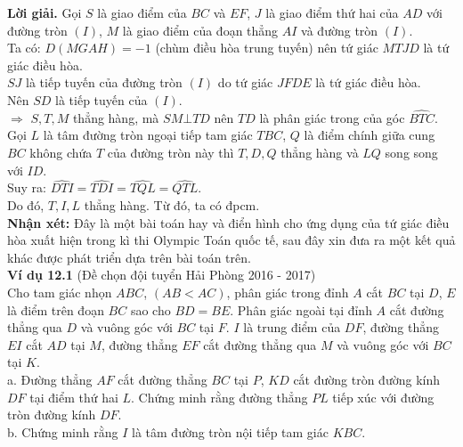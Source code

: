 \documentclass[12pt,a4paper]{article}
\begin{document}
\textbf{Lời giải.} Gọi \(S\) là giao điểm của \(BC\) và \(EF\), \(J\) là giao điểm thứ hai của \(AD\) với đường tròn \(\left( I \right)\), \(M\) là giao điểm của đoạn thẳng \(AI\) và đường tròn \(\left( I \right)\). \\
Ta có: \(D\left( {MGAH} \right) =  - 1\) (chùm điều hòa trung tuyến) nên tứ giác \(MTJD\) là tứ giác điều hòa.\\
\(SJ\) là tiếp tuyến của đường tròn \(\left( I \right)\) do tứ giác \(JFDE\) là tứ giác điều hòa.\\
Nên \(SD\) là tiếp tuyến của \(\left( I \right)\).\\
\( \Rightarrow \) \(S, T, M\) thẳng hàng, mà \(SM \bot TD\) nên \(TD\) là phân giác trong của góc \(\widehat {BTC}.\)\\
Gọi \(L\) là tâm đường tròn ngoại tiếp tam giác \(TBC\), \(Q\) là điểm chính giữa cung \(BC\) không chứa \(T\) của đường tròn này thì \(T, D, Q\) thẳng hàng và \(LQ\) song song với \(ID\).\\
Suy ra: \(\widehat {DTI} = \widehat {TDI} = \widehat {TQL} = \widehat {QTL}.\)\\
Do đó, \(T, I, L\) thẳng hàng. Từ đó, ta có đpcm.\\
\textbf{Nhận xét:} Đây là một bài toán hay và điển hình cho ứng dụng của tứ giác điều hòa xuất hiện trong kì thi Olympic Toán quốc tế, sau đây xin đưa ra một kết quả khác được phát triển dựa trên bài toán trên.\\
\textbf{Ví dụ 12.1} (Đề chọn đội tuyển Hải Phòng 2016 - 2017)\\
 Cho tam giác nhọn \(ABC\), \(\left( AB < AC \right)\), phân giác trong đỉnh \(A\) cắt \(BC\) tại \(D\), \(E\) là điểm trên đoạn \(BC\) sao cho \(BD = BE\). Phân giác ngoài tại đỉnh \(A\) cắt đường thẳng qua \(D\) và vuông góc với \(BC\) tại \(F\). \(I\) là trung điểm của \(DF\), đường thẳng \(EI\) cắt \(AD\) tại \(M\), đường thẳng \(EF\) cắt đường thẳng qua \(M\) và vuông góc với \(BC\) tại \(K\).\\
a. Đường thẳng \(AF\) cắt đường thẳng \(BC\) tại \(P\), \(KD\) cắt đường tròn đường kính \(DF\) tại điểm thứ hai \(L\). Chứng minh rằng đường thẳng \(PL\) tiếp xúc với đường tròn đường kính \(DF\).\\
b. Chứng minh rằng \(I\) là tâm đường tròn nội tiếp tam giác \(KBC\).
\newpage
\end{document}
